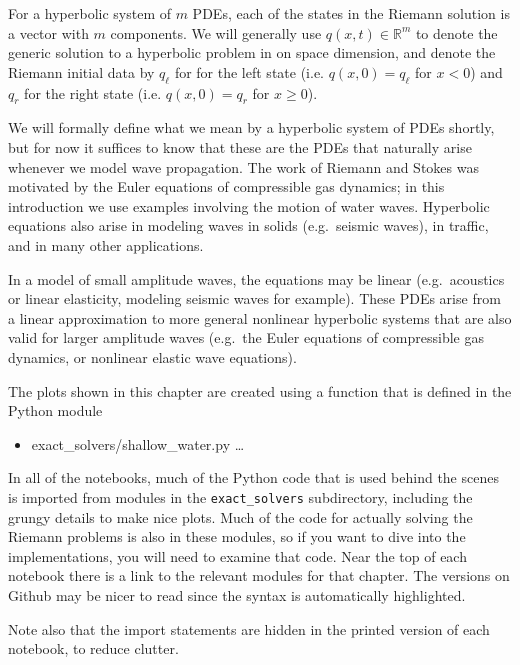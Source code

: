 \documentclass{SIAMbook2016}
\providecommand{\tightlist}{%
      \setlength{\itemsep}{0pt}\setlength{\parskip}{0pt}}
\begin{document}
For a hyperbolic system of \(m\) PDEs, each of the states in the Riemann
solution is a vector with \(m\) components. We will generally use
\(q(x,t)\in\mathbb{R}^m\) to denote the generic solution to a hyperbolic
problem in on space dimension, and denote the Riemann initial data by
\(q_\ell\) for for the left state (i.e. \(q(x,0) = q_\ell\) for \(x<0\))
and \(q_r\) for the right state (i.e. \(q(x,0) = q_r\) for
\(x \geq 0\)).

We will formally define what we mean by a hyperbolic system of PDEs
shortly, but for now it suffices to know that these are the PDEs that
naturally arise whenever we model wave propagation. The work of Riemann
and Stokes was motivated by the Euler equations of compressible gas
dynamics; in this introduction we use examples involving the motion of
water waves. Hyperbolic equations also arise in modeling waves in solids
(e.g.~seismic waves), in traffic, and in many other applications.

In a model of small amplitude waves, the equations may be linear
(e.g.~acoustics or linear elasticity, modeling seismic waves for
example). These PDEs arise from a linear approximation to more general
nonlinear hyperbolic systems that are also valid for larger amplitude
waves (e.g.~the Euler equations of compressible gas dynamics, or
nonlinear elastic wave equations).

The plots shown in this chapter are created using a function that is
defined in the Python module

\begin{itemize}
\tightlist
\item
  {exact\_solvers/shallow\_water.py} \ldots{}
\end{itemize}

In all of the notebooks, much of the Python code that is used behind the
scenes is imported from modules in the \texttt{exact\_solvers}
subdirectory, including the grungy details to make nice plots. Much of
the code for actually solving the Riemann problems is also in these
modules, so if you want to dive into the implementations, you will need
to examine that code. Near the top of each notebook there is a link to
the relevant modules for that chapter. The versions on Github may be
nicer to read since the syntax is automatically highlighted.

Note also that the import statements are hidden in the printed version
of each notebook, to reduce clutter.
\end{document}
